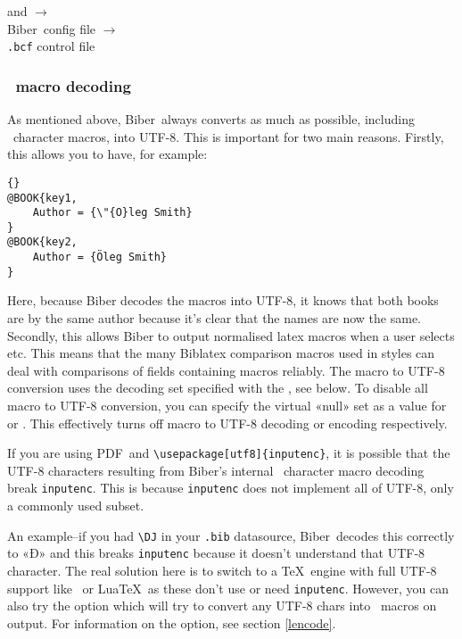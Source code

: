 \documentclass{ltxdockit}
\newcommand*{\biber}{Biber\xspace}
\newcommand*{\biblatex}{Biblatex\xspace}
\begin{document}
\noindent{} and  $\rightarrow$\\
\hspace*{1em}\biber\ config file $\rightarrow$\\
\hspace*{2em}\verb+.bcf+ control file

\subsubsection{\latex\ macro decoding}\label{ldecode}

\noindent As mentioned above, \biber\ always converts as much as possible,
including \latex\ character macros, into UTF-8. This is important for two
main reasons. Firstly, this allows you to have, for example:

\begin{lstlisting}[style=bibtex, columns=fixed]{}
@BOOK{key1,
    Author = {\"{O}leg Smith}
}
@BOOK{key2,
    Author = {Öleg Smith}
}
\end{lstlisting}
%
Here, because \biber decodes the macros into UTF-8, it knows that both
books are by the same author because it's clear that the names are now the
same. Secondly, this allows \biber to output normalised latex macros when a
user selects  etc. This means that the many
\biblatex comparison macros used in styles can deal with comparisons of
fields containing macros reliably. The macro to UTF-8 conversion uses the
decoding set specified with the , see below. To
disable all macro to UTF-8 conversion, you can specify the virtual «null»
set as a value for  or .
This effectively turns off macro to UTF-8 decoding or encoding respectively.

If you are using PDF\latex\ and \verb+\usepackage[utf8]{inputenc}+, it
is possible that the UTF-8 characters resulting from \biber's
internal \latex\ character macro decoding break \verb+inputenc+. This is
because \verb+inputenc+ does not implement all of UTF-8, only a
commonly used subset.

An example--if you had \verb+\DJ+ in your \verb+.bib+ datasource,
\biber\ decodes this correctly to «Đ» and this breaks \verb+inputenc+
because it doesn't understand that UTF-8 character. The real solution here
is to switch to a \TeX\ engine with full UTF-8 support like \XeTeX\ or Lua\TeX\
as these don't use or need \verb+inputenc+. However, you can also try the
 option which will try to convert any UTF-8 chars into
\latex\ macros on output. For information on the \opt{--output-safechars}
option, see section \ref{lencode}.
\bigskip
\end{document}
